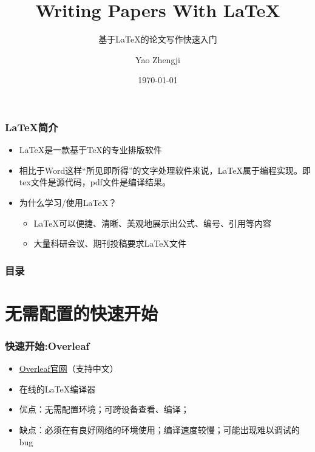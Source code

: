 \documentclass[xetex,mathserif,serif]{beamer}
\title{Writing Papers With \LaTeX{}}
\subtitle{基于\LaTeX{}的论文写作快速入门}
\author{Yao Zhengji}
\date{\today}
\institute{NEU}
\begin{document}
\frame{\maketitle}

\begin{frame} 
    \frametitle{\LaTeX{}简介} 
    \begin{itemize} 
        \item \LaTeX{}是一款基于\TeX{}的专业排版软件
        \item 相比于Word这样“所见即所得”的文字处理软件来说，\LaTeX{}属于编程实现。即tex文件是源代码，pdf文件是编译结果。
        \item 为什么学习/使用\LaTeX{}？
        \begin{itemize}
            \item \LaTeX{}可以便捷、清晰、美观地展示出公式、编号、引用等内容
            \item 大量科研会议、期刊投稿要求\LaTeX{}文件
        \end{itemize}
    \end{itemize} 
\end{frame}

\begin{frame}
    \frametitle{目录}
    \tableofcontents
\end{frame}

\section{无需配置的快速开始}
\begin{frame} 
    \frametitle{快速开始:Overleaf} 
    \begin{itemize} 
        \item \href{https://cn.overleaf.com/}{Overleaf官网}（支持中文）
        \item 在线的\LaTeX{}编译器
        \item 优点：无需配置环境；可跨设备查看、编译；
        \item 缺点：必须在有良好网络的环境使用；编译速度较慢；可能出现难以调试的bug
    \end{itemize} 
\end{frame}
\end{document}
